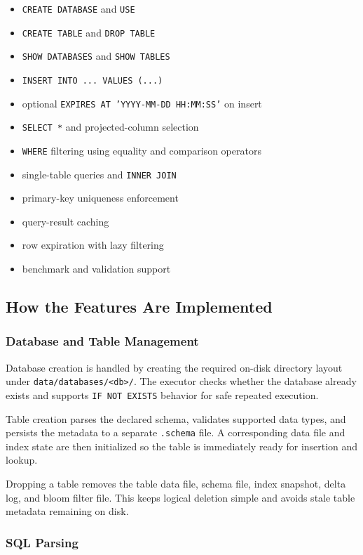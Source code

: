 \documentclass[12pt,a4paper]{article}
\begin{document}
\begin{itemize}[leftmargin=1.8em]
  \item \texttt{CREATE DATABASE} and \texttt{USE}
  \item \texttt{CREATE TABLE} and \texttt{DROP TABLE}
  \item \texttt{SHOW DATABASES} and \texttt{SHOW TABLES}
  \item \texttt{INSERT INTO ... VALUES (...)}
  \item optional \texttt{EXPIRES AT 'YYYY-MM-DD HH:MM:SS'} on insert
  \item \texttt{SELECT *} and projected-column selection
  \item \texttt{WHERE} filtering using equality and comparison operators
  \item single-table queries and \texttt{INNER JOIN}
  \item primary-key uniqueness enforcement
  \item query-result caching
  \item row expiration with lazy filtering
  \item benchmark and validation support
\end{itemize}

\subsection{How the Features Are Implemented}

\subsubsection{Database and Table Management}

Database creation is handled by creating the required on-disk directory layout
under \texttt{data/databases/<db>/}. The executor checks whether the database
already exists and supports \texttt{IF NOT EXISTS} behavior for safe repeated
execution.

Table creation parses the declared schema, validates supported data types, and
persists the metadata to a separate \texttt{.schema} file. A corresponding data
file and index state are then initialized so the table is immediately ready for
insertion and lookup.

Dropping a table removes the table data file, schema file, index snapshot,
delta log, and bloom filter file. This keeps logical deletion simple and avoids
stale table metadata remaining on disk.

\subsubsection{SQL Parsing}
\end{document}
